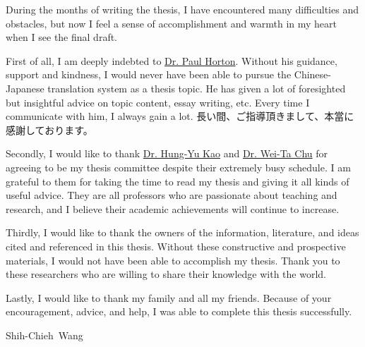 During the months of writing the thesis, I have encountered many difficulties and obstacles, but now I feel a sense of accomplishment and warmth in my heart when I see the final draft.

\begin{CJK}{UTF8}{ipxm}
First of all, I am deeply indebted to \href{https://paulhorton.gitlab.io/}{Dr. Paul Horton}. Without his guidance, support and kindness, I would never have been able to pursue the Chinese-Japanese translation system as a thesis topic. He has given a lot of foresighted but insightful advice on topic content, essay writing, etc. Every time I communicate with him, I always gain a lot. 長い間、ご指導頂きまして、本當に感謝しております。
\end{CJK}

Secondly, I would like to thank \href{https://ikmlab.csie.ncku.edu.tw/advisor.html}{Dr. Hung-Yu Kao} and \href{http://mmcv.csie.ncku.edu.tw/~wtchu/}{Dr. Wei-Ta Chu} for agreeing to be my thesis committee despite their extremely busy schedule. I am grateful to them for taking the time to read my thesis and giving it all kinds of useful advice. They are all professors who are passionate about teaching and research, and I believe their academic achievements will continue to increase.

Thirdly, I would like to thank the owners of the information, literature, and ideas cited and referenced in this thesis. Without these constructive and prospective materials, I would not have been able to accomplish my thesis. Thank you to these researchers who are willing to share their knowledge with the world.

Lastly, I would like to thank my family and all my friends. Because of your encouragement, advice, and help, I was able to complete this thesis successfully. 

\begin{flushright}
\mbox{Shih-Chieh Wang}
\end{flushright}